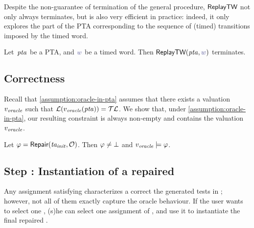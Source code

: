 \begin{tikzborder}{\cite{Gargantini16:validation}}
\begin{tikzborder}{\cite{gargantini_combinatorial_2017}}
\begin{tikzborder}{\cite{garn2019}}
\begin{tikzborder}{\cite{arcaini2019achieving}}
\begin{tikzborder}{\cite{arcaini2019varivolution}}
\begin{tikzborder}{}
\begin{remark}
	Despite the non-guarantee of termination of the general \EFsynth{} procedure, $\textsf{ReplayTW}$ not only always terminates, but is also very efficient in practice: indeed, it only explores the part of the PTA corresponding to the sequence of (timed) transitions imposed by the timed word.
\end{remark}

\begin{lemma}\label{lemma:replayTW:termination}
	Let~$\mathit{pta}$ be a PTA, and $\word$ be a timed word.
	Then $\replayTW(\ptaProc, \word)$ terminates.
\end{lemma}
\end{tikzborder}

\subsection{Correctness}

\begin{tikzborder}{}
Recall that \ref{assumption:oracle-in-pta} assumes that there exists a valuation~$v_{\mathit{oracle}}$ such that $\mathcal{L}(v_{\mathit{oracle}}(\mathit{pta})) = \mathcal{TL}$. We show that, under \ref{assumption:oracle-in-pta}, our resulting constraint is always non-empty and contains the valuation~$v_{\mathit{oracle}}$.

\begin{theorem}\label{theorem:correctness}
	Let $\varphi = \textsf{Repair}(\mathit{ta_{init}}, \mathcal{O})$.
	Then $\varphi \neq \bot$ and $v_{\mathit{oracle}} \models \varphi$.
\end{theorem}
\end{tikzborder}

\subsection{Step : Instantiation of a repaired \ta}

\begin{tikzborder}{}
Any assignment satisfying \ptaConstr characterizes a correct \ta \wrt{} the generated tests in \testSuiteTA; however, not all of them exactly capture the oracle behaviour.
If the user wants to select one \ta, (s)he can select one assignment \vRep of \ptaConstr, and use it to instantiate the final repaired \ta \repTa.


\end{tikzborder}
\end{tikzborder}
\end{tikzborder}
\end{tikzborder}
\end{tikzborder}
\end{tikzborder}
